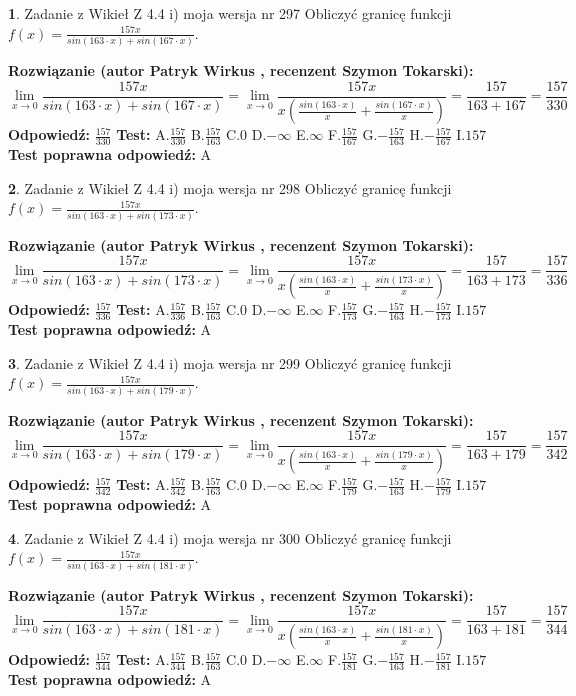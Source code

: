 \documentclass[12pt, a4paper]{article}
\theoremstyle{definition} %
\newtheorem{zad}{}
\newcommand{\zadStart}[1]{\begin{zad}#1\newline}
\newcommand{\zadStop}{\end{zad}}
\newcommand{\rozwStart}[2]{\noindent \textbf{Rozwiązanie (autor #1 , recenzent #2): }\newline}
\newcommand{\rozwStop}{\newline}
\newcommand{\odpStart}{\noindent \textbf{Odpowiedź:}\newline}
\newcommand{\odpStop}{\newline}
\newcommand{\testStart}{\noindent \textbf{Test:}\newline}
\newcommand{\testStop}{\newline}
\newcommand{\kluczStart}{\noindent \textbf{Test poprawna odpowiedź:}\newline}
\newcommand{\kluczStop}{\newline}
\begin{document}
\zadStart{Zadanie z Wikieł Z 4.4 i) moja wersja nr 297}
Obliczyć granicę funkcji $f(x)=\frac{157x}{sin(163\cdot x) +sin(167\cdot x)}$.
\zadStop
\rozwStart{Patryk Wirkus}{Szymon Tokarski}
$$\lim\limits_{x\to 0}\frac{157x}{sin(163\cdot x) +sin(167\cdot x)}=\lim\limits_{x\to 0}\frac{157x}{x(\frac{sin(163\cdot x)}{x}+\frac{sin(167\cdot x)}{x})}=\frac{157}{163+167} = \frac{157}{330}$$
\rozwStop
\odpStart
$\frac{157}{330}$
\odpStop
\testStart
A.$\frac{157}{330}$
B.$\frac{157}{163}$
C.$0$
D.$-\infty$
E.$\infty$
F.$\frac{157}{167}$
G.$-\frac{157}{163}$
H.$-\frac{157}{167}$
I.$157$
\testStop
\kluczStart
A
\kluczStop



\zadStart{Zadanie z Wikieł Z 4.4 i) moja wersja nr 298}
Obliczyć granicę funkcji $f(x)=\frac{157x}{sin(163\cdot x) +sin(173\cdot x)}$.
\zadStop
\rozwStart{Patryk Wirkus}{Szymon Tokarski}
$$\lim\limits_{x\to 0}\frac{157x}{sin(163\cdot x) +sin(173\cdot x)}=\lim\limits_{x\to 0}\frac{157x}{x(\frac{sin(163\cdot x)}{x}+\frac{sin(173\cdot x)}{x})}=\frac{157}{163+173} = \frac{157}{336}$$
\rozwStop
\odpStart
$\frac{157}{336}$
\odpStop
\testStart
A.$\frac{157}{336}$
B.$\frac{157}{163}$
C.$0$
D.$-\infty$
E.$\infty$
F.$\frac{157}{173}$
G.$-\frac{157}{163}$
H.$-\frac{157}{173}$
I.$157$
\testStop
\kluczStart
A
\kluczStop



\zadStart{Zadanie z Wikieł Z 4.4 i) moja wersja nr 299}
Obliczyć granicę funkcji $f(x)=\frac{157x}{sin(163\cdot x) +sin(179\cdot x)}$.
\zadStop
\rozwStart{Patryk Wirkus}{Szymon Tokarski}
$$\lim\limits_{x\to 0}\frac{157x}{sin(163\cdot x) +sin(179\cdot x)}=\lim\limits_{x\to 0}\frac{157x}{x(\frac{sin(163\cdot x)}{x}+\frac{sin(179\cdot x)}{x})}=\frac{157}{163+179} = \frac{157}{342}$$
\rozwStop
\odpStart
$\frac{157}{342}$
\odpStop
\testStart
A.$\frac{157}{342}$
B.$\frac{157}{163}$
C.$0$
D.$-\infty$
E.$\infty$
F.$\frac{157}{179}$
G.$-\frac{157}{163}$
H.$-\frac{157}{179}$
I.$157$
\testStop
\kluczStart
A
\kluczStop



\zadStart{Zadanie z Wikieł Z 4.4 i) moja wersja nr 300}
Obliczyć granicę funkcji $f(x)=\frac{157x}{sin(163\cdot x) +sin(181\cdot x)}$.
\zadStop
\rozwStart{Patryk Wirkus}{Szymon Tokarski}
$$\lim\limits_{x\to 0}\frac{157x}{sin(163\cdot x) +sin(181\cdot x)}=\lim\limits_{x\to 0}\frac{157x}{x(\frac{sin(163\cdot x)}{x}+\frac{sin(181\cdot x)}{x})}=\frac{157}{163+181} = \frac{157}{344}$$
\rozwStop
\odpStart
$\frac{157}{344}$
\odpStop
\testStart
A.$\frac{157}{344}$
B.$\frac{157}{163}$
C.$0$
D.$-\infty$
E.$\infty$
F.$\frac{157}{181}$
G.$-\frac{157}{163}$
H.$-\frac{157}{181}$
I.$157$
\testStop
\kluczStart
A
\kluczStop
\end{document}
